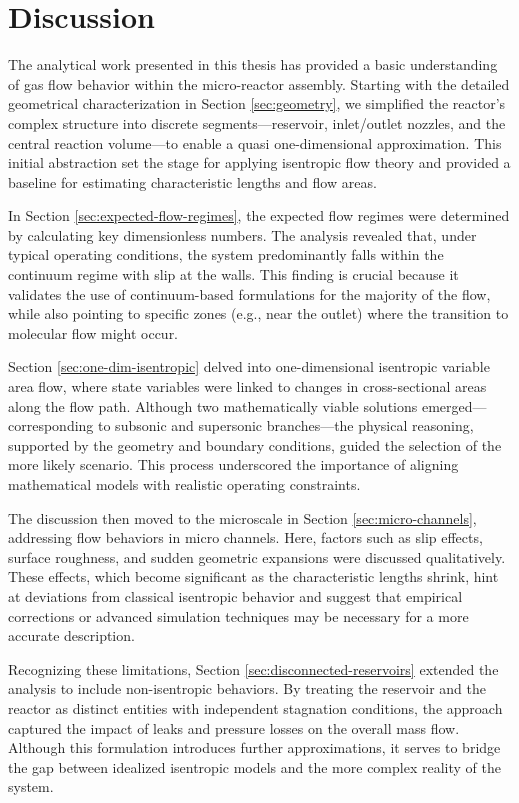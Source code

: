 \section*{Discussion}
The analytical work presented in this thesis has provided a basic understanding of gas flow behavior within the micro-reactor assembly.
Starting with the detailed geometrical characterization in Section \ref{sec:geometry}, we simplified the reactor’s complex structure into discrete segments—reservoir, inlet/outlet nozzles, and the central reaction volume—to enable a quasi one-dimensional approximation.
This initial abstraction set the stage for applying isentropic flow theory and provided a baseline for estimating characteristic lengths and flow areas.

In Section \ref{sec:expected-flow-regimes}, the expected flow regimes were determined by calculating key dimensionless numbers.
The analysis revealed that, under typical operating conditions, the system predominantly falls within the continuum regime with slip at the walls.
This finding is crucial because it validates the use of continuum-based formulations for the majority of the flow, while also pointing to specific zones (e.g., near the outlet) where the transition to molecular flow might occur.

Section \ref{sec:one-dim-isentropic} delved into one-dimensional isentropic variable area flow, where state variables were linked to changes in cross-sectional areas along the flow path.
Although two mathematically viable solutions emerged—corresponding to subsonic and supersonic branches—the physical reasoning, supported by the geometry and boundary conditions, guided the selection of the more likely scenario.
This process underscored the importance of aligning mathematical models with realistic operating constraints.

The discussion then moved to the microscale in Section \ref{sec:micro-channels}, addressing flow behaviors in micro channels.
Here, factors such as slip effects, surface roughness, and sudden geometric expansions were discussed qualitatively.
These effects, which become significant as the characteristic lengths shrink, hint at deviations from classical isentropic behavior and suggest that empirical corrections or advanced simulation techniques may be necessary for a more accurate description.

Recognizing these limitations, Section \ref{sec:disconnected-reservoirs} extended the analysis to include non-isentropic behaviors.
By treating the reservoir and the reactor as distinct entities with independent stagnation conditions, the approach captured the impact of leaks and pressure losses on the overall mass flow.
Although this formulation introduces further approximations, it serves to bridge the gap between idealized isentropic models and the more complex reality of the system.

